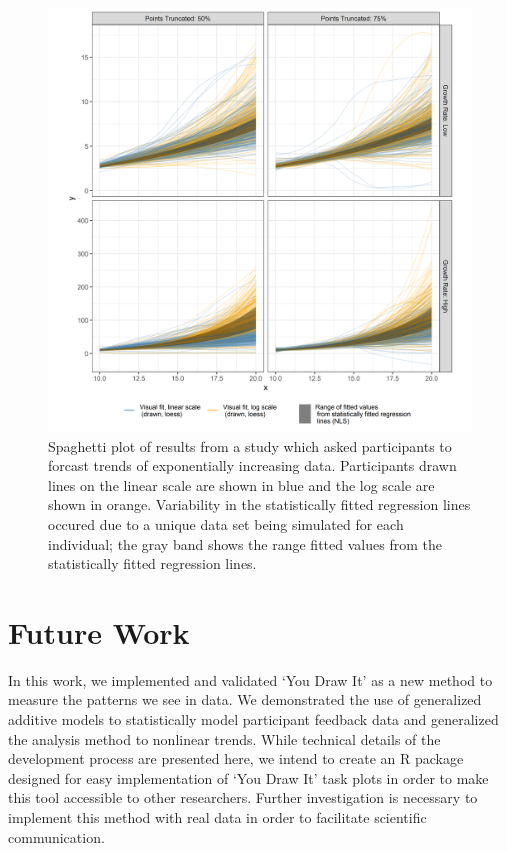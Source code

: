\documentclass[10pt]{article}
\begin{document}
\begin{figure}[ht]
\begin{center}
\centerline{\includegraphics[width=\columnwidth]{images/exponential-yloess-spaghetti-plot-2-1}}
\caption{Spaghetti plot of results from a study which asked participants to forcast trends of exponentially increasing data. Participants drawn lines on the linear scale are shown in blue and the log scale are shown in orange. Variability in the statistically fitted regression lines occured due to a unique data set being simulated for each individual; the gray band shows the range fitted values from the statistically fitted regression lines.}
\label{exponential-yloess-spaghetti-plot-2-1}
\end{center}
\end{figure}

\section{Future Work}

In this work, we implemented and validated `You Draw It' as a new method
to measure the patterns we see in data. We demonstrated the use of
generalized additive models to statistically model participant feedback
data and generalized the analysis method to nonlinear trends. While
technical details of the development process are presented here, we
intend to create an R package designed for easy implementation of `You
Draw It' task plots in order to make this tool accessible to other
researchers. Further investigation is necessary to implement this method
with real data in order to facilitate scientific communication.



% 
\end{document}
